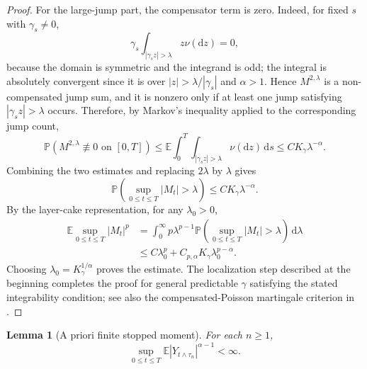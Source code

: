 \documentclass[11pt]{article}
\newtheorem{lemma}[theorem]{Lemma}
\newcommand{\E}{\mathbb{E}}
\newcommand{\Pbb}{\mathbb{P}}
\newcommand{\1}{\mathbf{1}}
\newcommand{\dd}{\,\mathrm{d}}
\newcommand{\md}{\mathrm{d}}
\begin{document}
\begin{proof}
For the large-jump part, the compensator term is zero. Indeed, for fixed $s$ with $\gamma_s\ne0$,
\[
  \gamma_s\int_{|\gamma_s z|>\lambda}z\nu(\md z)=0,
\]
because the domain is symmetric and the integrand is odd; the integral is absolutely convergent since it is over $|z|>\lambda/|\gamma_s|$ and $\alpha>1$. Hence $M^{2,\lambda}$ is a non-compensated jump sum, and it is nonzero only if at least one jump satisfying $|\gamma_s z|>\lambda$ occurs. Therefore, by Markov's inequality applied to the corresponding jump count,
\[
\Pbb\left(M^{2,\lambda}\not\equiv0\text{ on }[0,T]\right)
\le \E\int_0^T\int_{|\gamma_s z|>\lambda}\nu(\md z)\dd s
\le C K_\gamma\lambda^{-\alpha}.
\]
Combining the two estimates and replacing $2\lambda$ by $\lambda$ gives
\[
  \Pbb\left(\sup_{0\le t\le T}|M_t|>\lambda\right)
  \le C K_\gamma\lambda^{-\alpha}.
\]
By the layer-cake representation, for any $\lambda_0>0$,
\begin{align*}
\E\sup_{0\le t\le T}|M_t|^p
&=\int_0^\infty p\lambda^{p-1}\Pbb\left(\sup_{0\le t\le T}|M_t|>\lambda\right)\dd\lambda\\
&\le C\lambda_0^p+C_{p,\alpha}K_\gamma\lambda_0^{p-\alpha}.
\end{align*}
Choosing $\lambda_0=K_\gamma^{1/\alpha}$ proves the estimate. The localization step described at the beginning completes the proof for general predictable $\gamma$ satisfying the stated integrability condition; see also the compensated-Poisson martingale criterion in \cite[Ch.~II]{IkedaWatanabe1989}.
\end{proof}

\begin{lemma}[A priori finite stopped moment]\label{lem:apriori-stopped}
For each $n\ge1$,
\[
  \sup_{0\le t\le T}\E|Y_{t\wedge\tau_n}|^{\alpha-1}<\infty.
\]
\end{lemma}
\end{document}
